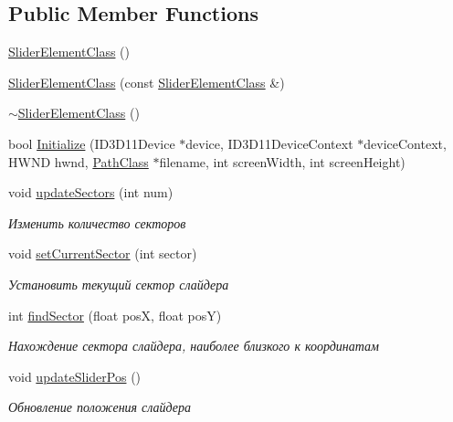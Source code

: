 \subsection*{Public Member Functions}
\begin{DoxyCompactItemize}
\item 
\hyperlink{class_slider_element_class_ab0a21e050e168c093acaacdd08f42485}{Slider\+Element\+Class} ()
\item 
\hyperlink{class_slider_element_class_a443da00bb006b0f96781d411ca44bd0e}{Slider\+Element\+Class} (const \hyperlink{class_slider_element_class}{Slider\+Element\+Class} \&)
\item 
\hyperlink{class_slider_element_class_adef8da61a826fda4f65760a01faab2dd}{$\sim$\+Slider\+Element\+Class} ()
\item 
bool \hyperlink{class_slider_element_class_af0f6ef5d1951738bcd89b4bbfa2446fd}{Initialize} (I\+D3\+D11\+Device $\ast$device, I\+D3\+D11\+Device\+Context $\ast$device\+Context, H\+W\+ND hwnd, \hyperlink{class_path_class}{Path\+Class} $\ast$filename, int screen\+Width, int screen\+Height)
\item 
void \hyperlink{class_slider_element_class_afaeaf76db88200577ce5ba50a4d74168}{update\+Sectors} (int num)
\begin{DoxyCompactList}\small\item\em Изменить количество секторов \end{DoxyCompactList}\item 
void \hyperlink{class_slider_element_class_a92483627168297bada61915e1624079a}{set\+Current\+Sector} (int sector)
\begin{DoxyCompactList}\small\item\em Установить текущий сектор слайдера \end{DoxyCompactList}\item 
int \hyperlink{class_slider_element_class_a38976cdbfa4bee454446fd2a621b4584}{find\+Sector} (float posX, float posY)
\begin{DoxyCompactList}\small\item\em Нахождение сектора слайдера, наиболее близкого к координатам \end{DoxyCompactList}\item 
void \hyperlink{class_slider_element_class_ae6da9df56c59128fa0b36816d817182d}{update\+Slider\+Pos} ()
\begin{DoxyCompactList}\small\item\em Обновление положения слайдера \end{DoxyCompactList}\item 

\end{DoxyCompactItemize}
